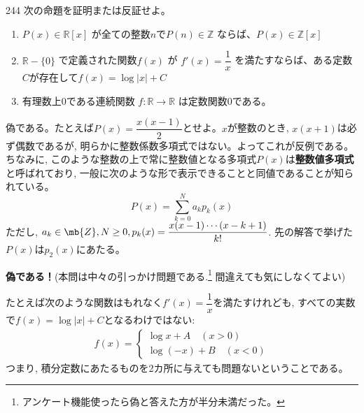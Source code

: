 \begin{thm}{244}{}{}
 次の命題を証明または反証せよ。
 \begin{enumerate}
  \item $P(x)\in\mathbb{R}[x]$ が全ての整数$n$で$P(n)\in\mathbb{Z}$ ならば、$P(x)\in\mathbb{Z}[x]$
  \item $\mathbb{R}-\{0\}$ で定義された関数$f(x)$ が $f'(x)=\dfrac{1}{x}$ を満たすならば、ある定数$C$が存在して$f(x)=\log |x|+C$
  \item 有理数上0である連続関数 $f:\mathbb{R}\rightarrow\mathbb{R}$ は定数関数0である。
 \end{enumerate}
\end{thm}

偽である。たとえば$P(x) = \dfrac{x(x-1)}{2}$とせよ。$x$が整数のとき, $x(x+1)$は必ず偶数であるが, 明らかに整数係数多項式ではない。よってこれが反例である。ちなみに, このような整数の上で常に整数値となる多項式$P(x)$は\textbf{整数値多項式}と呼ばれており, 一般に次のような形で表示できることと同値であることが知られている。
\[ P(x) = \sum_{k=0}^{N} a_kp_{k}(x) \]
ただし, $a_k\in\mb{Z}, N\geq 0,  p_{k}(x) = \dfrac{x(x-1)\cdots (x-k+1)}{k!}$.  先の解答で挙げた$P(x)$は$p_2(x)$にあたる。

 \textbf{偽である！}(本問は中々の引っかけ問題である.\footnote{アンケート機能使ったら偽と答えた方が半分未満だった。} 間違えても気にしなくてよい)

たとえば次のような関数はもれなく$f'(x)=\dfrac{1}{x}$を満たすけれども, すべての実数で$f(x) = \log{|x|}+C$となるわけではない:
\begin{align*}
 f(x)=\left\{
 \begin{aligned}
  \log{x}+A \quad(x>0) \\
  \log{(-x)}+B \quad (x<0)
 \end{aligned}
 \right.
\end{align*}
つまり, 積分定数にあたるものを2カ所に与えても問題ないということである。

